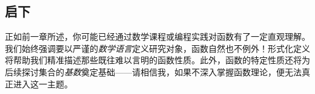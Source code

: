 
\subsection{启下}

正如前一章所述，你可能已经通过数学课程或编程实践对函数有了一定直观理解。我们始终强调要以严谨的\emph{数学语言}定义研究对象，函数自然也不例外！形式化定义将帮助我们精准描述那些既往难以言明的函数性质。此外，函数的特定性质还将为后续探讨集合的\emph{基数}奠定基础——请相信我，如果不深入掌握函数理论，便无法真正进入这一主题。
